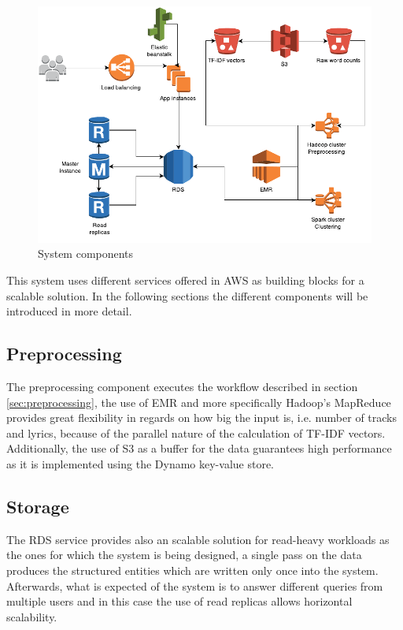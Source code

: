 \documentclass[11pt,a4paper]{scrartcl}
\begin{document}
  \begin{figure}
    \centering
    \includegraphics[scale=0.8]{img/architecture}
    \caption{System components}
    \label{fig:architecture}
  \end{figure}          
      
  This system uses different services offered in AWS as building blocks for a
  scalable solution. In the following sections the different components will
  be introduced in more detail.
  
  \subsection{Preprocessing}

  The preprocessing component executes the workflow described in section
  \ref{sec:preprocessing}, the use of EMR and more specifically Hadoop's
  MapReduce provides great flexibility in regards on how big the input is, i.e.
  number of tracks and lyrics, because of the parallel nature of the
  calculation of TF-IDF vectors. Additionally, the use of S3 as a buffer for
  the data guarantees high performance as it is implemented using the Dynamo
  key-value store.
  
  \subsection{Storage}
  
  The RDS service provides also an scalable solution for read-heavy workloads
  as the ones for which the system is being designed, a single pass on the data
  produces the structured entities which are written only once into the system.
  Afterwards, what is expected of the system is to answer different queries from
  multiple users and in this case the use of read replicas allows horizontal
  scalability.
  
\end{document}
